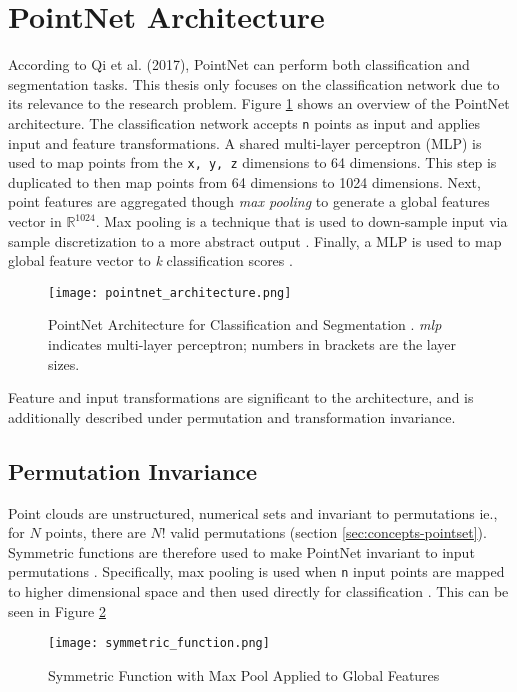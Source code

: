 \section{PointNet Architecture}
According to Qi et al. (2017), PointNet can perform both classification and segmentation tasks. This thesis only focuses on the classification network due to its relevance to the research problem. Figure \ref{fig:pointnet-architecture} shows an overview of the PointNet architecture. The classification network accepts \texttt{n} points as input and applies input and feature transformations. A shared multi-layer perceptron (MLP) is used to map points from the \texttt{x, y, z} dimensions to 64 dimensions. This step is duplicated to then map points from 64 dimensions to 1024 dimensions. Next, point features are aggregated though \textit{max pooling} to generate a global features vector in $\mathbb{R}^{1024}$. Max pooling is a technique that is used to down-sample input via sample discretization to a more abstract output \cite{ian2016deep}. Finally, a MLP is used to map global feature vector to \textit{k} classification scores \cite{qi2017pointnet}. 

\begin{figure}[ht!]
    \centering
    \texttt{[image: pointnet\_architecture.png]}
    \caption{PointNet Architecture for Classification and Segmentation \cite{qi2017pointnet}.
    \textit{mlp} indicates multi-layer perceptron; numbers in brackets are the layer sizes.}
    \label{fig:pointnet-architecture}
\end{figure}

Feature and input transformations are significant to the architecture, and is additionally described under permutation and transformation invariance. 

\subsection{Permutation Invariance}
Point clouds are unstructured, numerical sets and invariant to permutations ie., for $N$ points, there are $N!$ valid permutations (section \ref{sec:concepts-pointset}). Symmetric functions are therefore used to make PointNet invariant to input permutations \cite{qi2017pointnet}. Specifically, max pooling is used when \texttt{n} input points are mapped to higher dimensional space and then used directly for classification \cite{qi2017pointnet}. This can be seen in Figure \ref{fig:pointnet-symmetric}

\begin{figure} [ht!]
    \centering
    \texttt{[image: symmetric\_function.png]}
    \caption{Symmetric Function with Max Pool Applied to Global Features \cite{qi2017pointnet}}
    \label{fig:pointnet-symmetric}
\end{figure}

